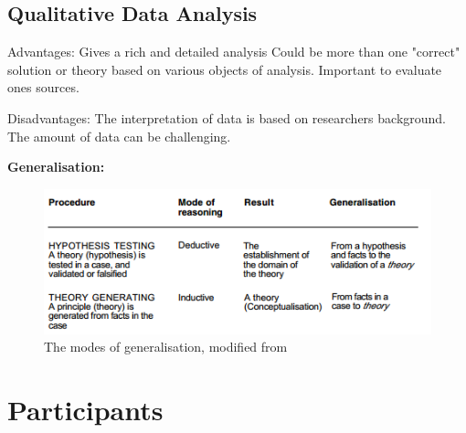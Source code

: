 \subsection{Qualitative Data Analysis}
\label{sec:qualitativeAnalysis}

Advantages:
Gives a rich and detailed analysis
Could be more than one "correct" solution or theory based on various objects of analysis.
Important to evaluate ones sources.

Disadvantages:
The interpretation of data is based on researchers background.
The amount of data can be challenging.

\textbf{Generalisation:}


\begin{figure}[H]
\begin{center}
\includegraphics[scale=0.9]{ModesOfGeneralisation.png}
\caption[The modes of generalisation]{The modes of generalisation, modified from \cite{johansson2003case}}
\label{fig:modesofgeneralisation}
\end{center}
\end{figure}

\section{Participants}

